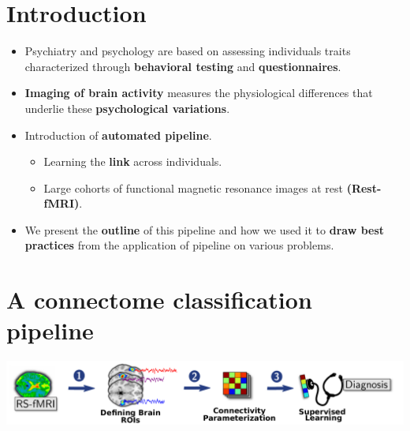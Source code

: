 \documentclass[portrait,a0,final]{a0poster} %
\begin{document}
\begin{minipage}{0.98\linewidth}

\begin{minipage}[t]{0.48\linewidth}
\setlength{\parindent}{10mm} %

\section{Introduction}
\begin{itemize}
    \item Psychiatry and psychology are based on assessing individuals traits
        characterized through \textbf{behavioral testing} and
        \textbf{questionnaires}.
    \item \textbf{Imaging of brain activity} measures the physiological
        differences that underlie these \textbf{psychological
        variations}\cite{miller}.
    \item Introduction of \textbf{automated pipeline}\cite{abraham}.
        \begin{itemize}
            \item  Learning the \textbf{link} across individuals.
            \item Large cohorts of functional magnetic resonance images at
                rest \textbf{(Rest-fMRI)}.
        \end{itemize}
    \item We present the \textbf{outline} of this pipeline
        and how we used it to \textbf{draw best practices} from the
        application of pipeline on
        various problems.
\end{itemize}

\vspace{0.3\sectionspace}
\section{A connectome classification pipeline}

\begin{center}
\includegraphics[width=1\linewidth]{figures/functional_connectivity_pipeline.pdf}
\end{center}



\end{minipage}
\end{minipage}
\end{document}
